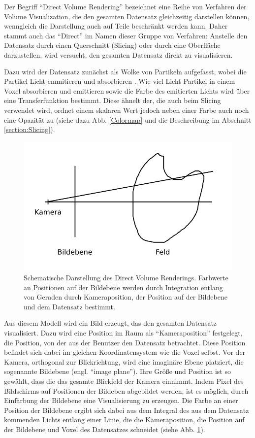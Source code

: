 \documentclass[a4paper,fontsize=12pt,toc=bib,halfparskip]{scrartcl}
\begin{document}
Der Begriff ``Direct Volume Rendering'' bezeichnet eine Reihe von Verfahren der Volume Visualization, die den gesamten Datensatz gleichzeitig darstellen k\"onnen, wenngleich die Darstellung auch auf Teile beschr\"ankt werden kann. Daher stammt auch das ``Direct'' im Namen dieser Gruppe von Verfahren: Anstelle den Datensatz durch einen Querschnitt (Slicing) oder durch eine Oberfl\"ache darzustellen, wird versucht, den gesamten Datensatz direkt zu visualisieren.

Dazu wird der Datensatz zun\"achst als Wolke von Partikeln aufgefasst, wobei die Partikel Licht emmitieren und absorbieren \cite[s.~134f]{kaufman2005overview}. Wie viel Licht Partikel in einem Voxel absorbieren und emittieren sowie die Farbe des emitierten Lichts wird \"uber eine Transferfunktion bestimmt. Diese \"ahnelt der, die auch beim Slicing verwendet wird, ordnet einem skalaren Wert jedoch neben einer Farbe auch noch eine Opazit\"at zu (siehe dazu Abb. \ref{Colormap} und die Beschreibung im Abschnitt \ref{section:Slicing}).

\begin{figure}
	\centering
	\includegraphics{pictures/DVR.png}
	\caption{Schematische Darstellung des Direct Volume Renderings. Farbwerte an Positionen auf der Bildebene werden durch Integration entlang von Geraden durch Kameraposition, der Position auf der Bildebene und dem Datensatz bestimmt.}
	\label{DVR}
\end{figure}

Aus diesem Modell wird ein Bild erzeugt, das den gesamten Datensatz visualisiert. Dazu wird eine Position im Raum als ``Kameraposition'' festgelegt, die Position, von der aus der Benutzer den Datensatz betrachtet. Diese Position befindet sich dabei im gleichen Koordinatensystem wie die Voxel selbst. Vor der Kamera, orthogonal zur Blickrichtung, wird eine imagin\"are Ebene platziert, die sogenannte Bildebene (engl. ``image plane''). Ihre Gr\"o{\ss}e und Position ist so gew\"ahlt, dass die das gesamte Blickfeld der Kamera einnimmt. Indem Pixel des Bildschirms auf Positionen der Bildeben abgebildet werden, ist es m\"oglich, durch Einf\"arbung der Bildebene eine Visualisierung zu erzeugen. Die Farbe an einer Position der Bildebene ergibt sich dabei aus dem Integral des aus dem Datensatz kommenden Lichts entlang einer Linie, die die Kameraposition, die Position auf der Bildebene und Voxel des Datensatzes schneidet (siehe Abb. \ref{DVR}).
\end{document}
